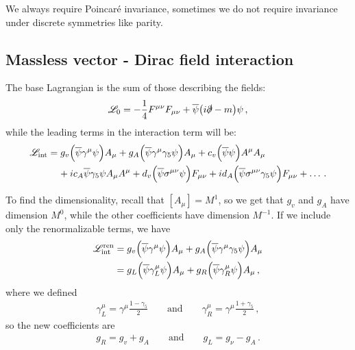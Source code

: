 \documentclass[main.tex]{subfiles}
\begin{document}
We always require Poincaré invariance, sometimes we do not require invariance under discrete symmetries like parity. 

\subsection{Massless vector - Dirac field interaction}

The base Lagrangian is the sum of those describing the fields: 
%
\begin{align}
\mathscr{L}_{0}
= - \frac{1}{4} F^{\mu \nu } F_{\mu \nu }
+ \overline{\psi} \qty(i \slashed{\partial} - m ) \psi 
\,,
\end{align}
%
while the leading terms in the interaction term will be: 
%
\begin{subequations}
\begin{align}
\begin{split}
\mathscr{L} _{\text{int}}
&= g_{v } \qty(\overline{\psi} \gamma^{\mu } \psi ) A_{\mu }
+ g_{A} \qty(\overline{\psi} \gamma^{\mu } \gamma_{5} \psi )A_{\mu }
+ c_{v } \qty(\overline{\psi} \psi ) A^{\mu } A_{\mu } 
\\
&\phantom{=}\ 
+ i c_A \overline{\psi} \gamma_{5} \psi A_{\mu }A^{\mu }
+ d_{v } \qty(\overline{\psi} \sigma^{\mu \nu }\psi )F_{\mu \nu }
+ i d_A  \qty(\overline{\psi} \sigma^{\mu \nu } \gamma_5 \psi) F_{\mu\nu  } + \dots
\,.
\end{split}
\end{align}
\end{subequations}

To find the dimensionality, recall that \([A_{\mu }] = M^{1}\), so we get that \(g_v \) and \(g_A\) have dimension \(M^{0}\), while the other coefficients have dimension \(M^{-1}\). 
If we include only the renormalizable terms, we have 
%
\begin{subequations}
\begin{align}
\mathscr{L} _{\text{int}}^{\text{ren}}
&= g_{v } \qty(\overline{\psi} \gamma^{\mu } \psi ) A_{\mu }
+ g_{A} \qty(\overline{\psi} \gamma^{\mu } \gamma_{5} \psi )A_{\mu }  \\
&= g_{L } \qty(\overline{\psi} \gamma^{\mu }_{L} \psi ) A_{\mu }+
 g_{R } \qty(\overline{\psi} \gamma^{\mu }_{R} \psi ) A_{\mu }
\,,
\end{align}
\end{subequations}
%
where we defined 
%
\begin{align}
\gamma^{\mu }_{L} = \gamma^{\mu } \frac{1 - \gamma_5 }{2} 
\qquad \text{and} \qquad
\gamma^{\mu }_{R} = \gamma^{\mu } \frac{1 + \gamma_5 }{2} 
\,,
\end{align}
%
so the new coefficients are 
%
\begin{align}
g_R = g_{v } + g_A \qquad \text{and} \qquad
g_L = g_{\nu } - g_A
\,.
\end{align}
\end{document}
